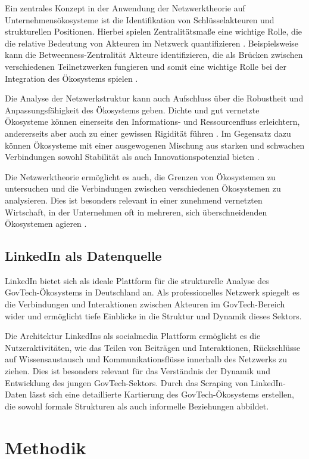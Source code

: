 \documentclass[a4paper,11pt]{article}
\begin{document}
Ein zentrales Konzept in der Anwendung der Netzwerktheorie auf Unternehmensökosysteme ist die Identifikation von Schlüsselakteuren und strukturellen Positionen. Hierbei spielen Zentralitätsmaße eine wichtige Rolle, die die relative Bedeutung von Akteuren im Netzwerk quantifizieren \parencite{Freeman1978}. Beispielsweise kann die Betweenness-Zentralität Akteure identifizieren, die als Brücken zwischen verschiedenen Teilnetzwerken fungieren und somit eine wichtige Rolle bei der Integration des Ökosystems spielen \parencite{Burt2004}.

Die Analyse der Netzwerkstruktur kann auch Aufschluss über die Robustheit und Anpassungsfähigkeit des Ökosystems geben. Dichte und gut vernetzte Ökosysteme können einerseits den Informations- und Ressourcenfluss erleichtern, andererseits aber auch zu einer gewissen Rigidität führen \parencite{Uzzi1997}. Im Gegensatz dazu können Ökosysteme mit einer ausgewogenen Mischung aus starken und schwachen Verbindungen sowohl Stabilität als auch Innovationspotenzial bieten \parencite{Granovetter1973}.

Die Netzwerktheorie ermöglicht es auch, die Grenzen von Ökosystemen zu untersuchen und die Verbindungen zwischen verschiedenen Ökosystemen zu analysieren. Dies ist besonders relevant in einer zunehmend vernetzten Wirtschaft, in der Unternehmen oft in mehreren, sich überschneidenden Ökosystemen agieren \parencite{Shipilov2015}.
\subsection{LinkedIn als Datenquelle}
LinkedIn bietet sich als ideale Plattform für die strukturelle Analyse des GovTech-Ökosystems in Deutschland an. Als professionelles Netzwerk spiegelt es die Verbindungen und Interaktionen zwischen Akteuren im GovTech-Bereich wider und ermöglicht tiefe Einblicke in die Struktur und Dynamik dieses Sektors.

Die Architektur LinkedIns  als socialmedia Plattform ermöglicht es die Nutzeraktivitäten, wie das Teilen von Beiträgen und Interaktionen, Rückschlüsse auf Wissensaustausch und Kommunikationsflüsse innerhalb des Netzwerks zu ziehen. Dies ist besonders relevant für das Verständnis der Dynamik und Entwicklung des jungen GovTech-Sektors. Durch das Scraping von LinkedIn-Daten lässt sich eine detaillierte Kartierung des GovTech-Ökosystems erstellen, die sowohl formale Strukturen als auch informelle Beziehungen abbildet.\parencite{Sachini2022}

\section{Methodik}
\end{document}

